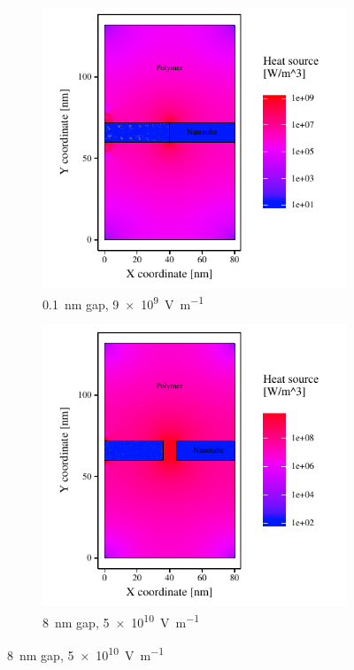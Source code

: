 \documentclass[11pt,review,times]{article}
\begin{document}
\begin{figure}[htb]
	\centering
	\begin{subfigure}{0.49\textwidth}
		\centering
		\captionsetup{width=0.9\textwidth}
		\includegraphics[width=\textwidth]{resultats_0,1nm_comsol_2D_puissance}
		\caption{\SI{0.1}{\nano\metre} gap, \SI{9e9}{\volt\per\metre}}
		\label{fig:result_gap01nm_power}		
	\end{subfigure} 
	\begin{subfigure}{0.49\textwidth}
		\centering
		\captionsetup{width=0.9\textwidth}
		\includegraphics[width=\textwidth]{resultats_8nm_comsol_2D_puissance}
		\caption{\SI{8}{\nano\metre} gap, \SI{5e10}{\volt\per\metre}}
		\label{fig:result_gap8nm_power}		
	\end{subfigure}


\end{figure}
\end{document}
